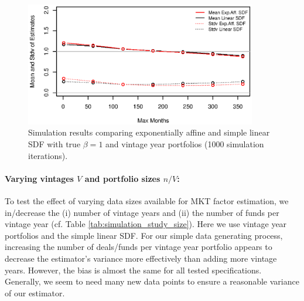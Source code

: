\documentclass[12pt]{article}
\begin{document}
\begin{figure}
	\centering
	\includegraphics[width=0.9\textwidth]{Figures/spatial/Simulationexpaffvssimlin}
	\caption{Simulation results comparing exponentially affine and simple linear SDF with true $\beta=1$ and vintage year portfolios (1000 simulation iterations).}
	\label{fig:simulation_expaff_vs_simlin}
\end{figure}


\paragraph{Varying vintages $V$ and portfolio sizes $n/V$:}

To test the effect of varying data sizes available for MKT factor estimation, we in/decrease the (i) number of vintage years and (ii) the number of funds per vintage year (cf. Table \ref{tab:simulation_study_size}).
Here we use vintage year portfolios and the simple linear SDF.
For our simple data generating process, increasing the number of deals/funds per vintage year portfolio appears to decrease the estimator's variance more effectively than adding more vintage years.
However, the bias is almost the same for all tested specifications.
Generally, we seem to need many new data points to ensure a reasonable variance of our estimator.

\begin{table}[ht]
	\centering
	\caption{Simulation study for varying  number of vintages and number of funds per vintage. 
		We use vintage year portfolios, the simple linear SDF with true $\beta_{\mathrm{MKT}}=1$, maximum month 180, and 500 simulation iterations.} 
	\label{tab:simulation_study_size}
\end{table}
\end{document}
